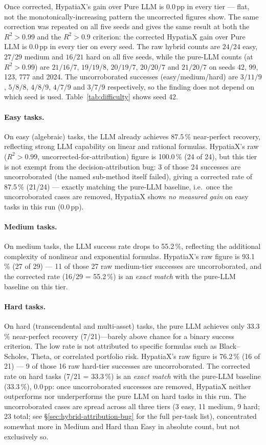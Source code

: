 \documentclass[twoside,11pt]{article}
\newcommand{\Rsq}{R^{2}}
\begin{document}
Once corrected, HypatiaX's gain over Pure LLM is $0.0$\,pp in every tier ---
flat, not the monotonically-increasing pattern the uncorrected figures show. The same correction was repeated on all five seeds and
gives the same result at both the $\Rsq>0.99$ and the $\Rsq>0.9$ criterion:
the corrected HypatiaX gain over Pure LLM is $0.0$\,pp in every tier on every
seed. The raw hybrid counts are $24/24$ easy, $27/29$ medium and $16/21$ hard
on all five seeds, while the pure-LLM counts (at $\Rsq>0.99$) are $21/16/7$,
$19/19/8$, $20/19/7$, $20/20/7$ and $21/20/7$ on seeds 42, 99, 123, 777 and
2024. The uncorroborated successes (easy/medium/hard) are $3/11/9$, $5/8/8$,
$4/8/9$, $4/7/9$ and $3/7/9$ respectively, so the finding does not depend on
which seed is used. Table~\ref{tab:difficulty} shows seed 42.

\paragraph{Easy tasks.}
On easy (algebraic) tasks, the LLM already achieves 87.5\,\% near-perfect recovery,
reflecting strong LLM capability on linear and rational formulas. HypatiaX's
raw ($\Rsq>0.99$, uncorrected-for-attribution) figure is 100.0\,\% (24 of 24),
but this tier is not exempt from the decision-attribution bug: 3 of those 24
successes are uncorroborated (the named sub-method itself failed), giving a
corrected rate of 87.5\,\% (21/24) --- exactly matching
the pure-LLM baseline, i.e.\ once the uncorroborated cases are removed, HypatiaX shows
\emph{no measured gain} on easy tasks in this run ($0.0$\,pp).

\paragraph{Medium tasks.}
On medium tasks, the LLM success rate drops to 55.2\,\%, reflecting the additional
complexity of nonlinear and exponential formulas. HypatiaX's raw figure is 93.1\,\%
(27 of 29) --- 11 of those 27 raw medium-tier successes are uncorroborated, and the
corrected rate (16/29 = 55.2\,\%) is an \emph{exact match} with the pure-LLM
baseline on this tier.

\paragraph{Hard tasks.}
On hard (transcendental and multi-asset) tasks, the pure LLM achieves only 33.3\,\%
near-perfect recovery (7/21)---barely above chance for a binary success criterion. The
low rate is not attributed to specific formulas such as
Black--Scholes, Theta, or correlated portfolio risk. HypatiaX's raw figure is 76.2\,\%
(16 of 21) --- 9 of those 16 raw hard-tier successes are uncorroborated. The corrected rate on hard
tasks (7/21 = 33.3\,\%) is an \emph{exact match} with the pure-LLM baseline
(33.3\,\%), $0.0$\,pp: once uncorroborated successes are removed, HypatiaX neither outperforms nor
underperforms the pure LLM on hard tasks in this run.
The uncorroborated cases are spread across all three tiers (3 easy, 11 medium, 9 hard;
23 total; see \S\ref{sec:hybrid-attribution-bug} for the full per-task list),
concentrated somewhat more in Medium and Hard than Easy in absolute count, but
not exclusively so.
\end{document}
